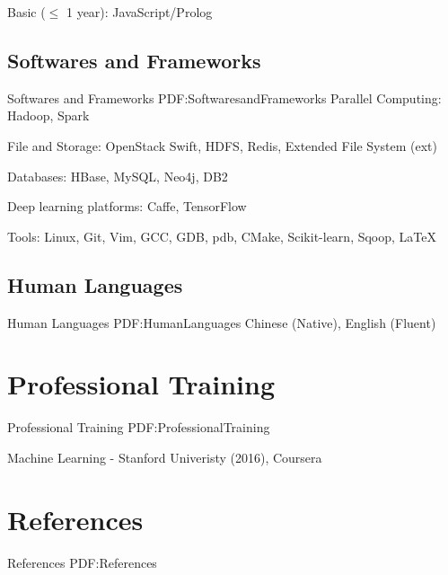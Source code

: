 \documentclass[letterpaper,10pt,oneside]{article}
\begin{document}
\begin{body}
\GapNoBreak
\BulletItem
Basic ($\leq$ 1 year): JavaScript/Prolog
\BigGap
\GapNoBreak
\subsection
{Softwares and Frameworks}
{Softwares and Frameworks}
{PDF:SoftwaresandFrameworks}
\GapNoBreak
\BulletItem
Parallel Computing: Hadoop, Spark

\GapNoBreak
\BulletItem
File and Storage: OpenStack Swift, HDFS, Redis, Extended File System (ext)

\GapNoBreak
\BulletItem
Databases: HBase, MySQL, Neo4j, DB2

\GapNoBreak
\BulletItem
Deep learning platforms: Caffe, TensorFlow

\GapNoBreak
\BulletItem
Tools: Linux, Git, Vim, GCC, GDB, pdb, CMake, Scikit-learn, Sqoop,
{\LaTeX}

\BigGap
\subsection
{Human Languages}
{Human Languages}
{PDF:HumanLanguages}
\GapNoBreak
\BulletItem
Chinese (Native), English (Fluent)


\section
{Professional Training}
{Professional Training}
{PDF:ProfessionalTraining}

Machine Learning - Stanford Univeristy (2016), Coursera






\iffalse
\section
{References}
{References}
{PDF:References}


\end{body}
\end{document}
